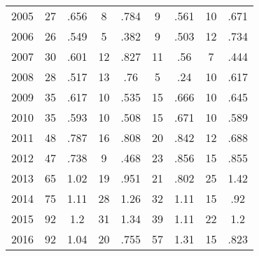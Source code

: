 \begin{table}[htbp]
\begin{tabular}{l*{8}{c}}
2005      &       27&     .656&        8&     .784&        9&     .561&       10&     .671\\
2006      &       26&     .549&        5&     .382&        9&     .503&       12&     .734\\
2007      &       30&     .601&       12&     .827&       11&      .56&        7&     .444\\
2008      &       28&     .517&       13&      .76&        5&      .24&       10&     .617\\
2009      &       35&     .617&       10&     .535&       15&     .666&       10&     .645\\
2010      &       35&     .593&       10&     .508&       15&     .671&       10&     .589\\
2011      &       48&     .787&       16&     .808&       20&     .842&       12&     .688\\
2012      &       47&     .738&        9&     .468&       23&     .856&       15&     .855\\
2013      &       65&     1.02&       19&     .951&       21&     .802&       25&     1.42\\
2014      &       75&     1.11&       28&     1.26&       32&     1.11&       15&      .92\\
2015      &       92&      1.2&       31&     1.34&       39&     1.11&       22&      1.2\\
2016      &       92&     1.04&       20&     .755&       57&     1.31&       15&     .823\\
\hline\hline
\end{tabular}
\end{table}
